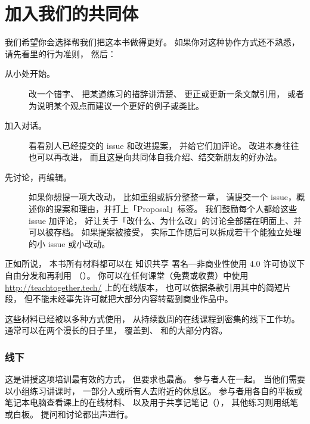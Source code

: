 \chapter{加入我们的共同体}\label{s:joining}

我们希望你会选择帮我们把这本书做得更好。
如果你对这种协作方式还不熟悉，
请先看里的行为准则，
然后：

\begin{description}

\item[从小处开始。]
  改一个错字、
  把某道练习的措辞讲清楚、
  更正或更新一条文献引用，
  或者为说明某个观点而建议一个更好的例子或类比。

\item[加入对话。]
  看看别人已经提交的 issue 和改进提案，
  并给它们加评论。
  改进本身往往也可以再改进，
  而且这是向共同体自我介绍、结交新朋友的好办法。

\item[先讨论，再编辑。]
  如果你想提一项大改动，
  比如重组或拆分整整一章，
  请提交一个 issue，概述你的提案和理由，并打上「Proposal」标签。
  我们鼓励每个人都给这些 issue 加评论，
  好让关于「改什么、为什么改」的讨论全部摆在明面上、并可以被存档。
  如果提案被接受，
  实际工作随后可以拆成若干个能独立处理的小 issue 或小改动。

\end{description}


正如所说，
本书所有材料都可以在
知识共享 署名—非商业性使用 4.0 许可协议下自由分发和再利用
（）。
你可以在任何课堂（免费或收费）中使用 \url{http://teachtogether.tech/} 上的在线版本，
也可以依据条款引用其中的简短片段，
但不能未经事先许可就把大部分内容转载到商业作品中。

这些材料已经被以多种方式使用，
从持续数周的在线课程到密集的线下工作坊。
通常可以在两个漫长的日子里，
覆盖到、
和的大部分内容。

\subsection*{线下}

这是讲授这项培训最有效的方式，
但要求也最高。
参与者人在一起。
当他们需要以小组练习讲课时，
一部分人或所有人去附近的休息区。
参与者用各自的平板或笔记本电脑查看课上的在线材料、
以及用于共享记笔记（），
其他练习则用纸笔或白板。
提问和讨论都出声进行。

